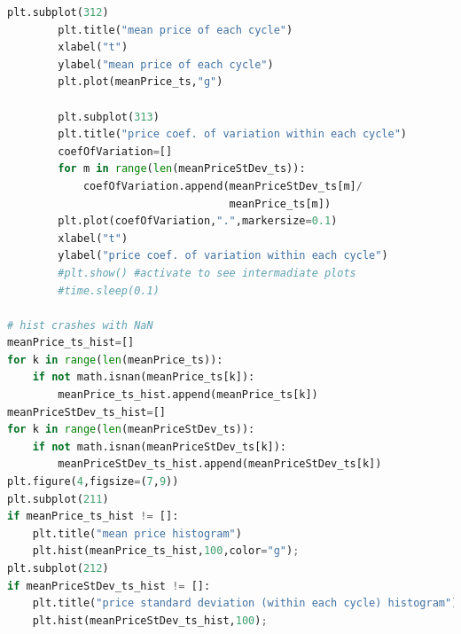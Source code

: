 \documentclass[10pt]{report}
\renewcommand{\thesection}{\arabic{section}} %
\begin{document}
\begin{lstlisting}[language=Python, caption=The unstructured version, 
label={The unstructured version},basicstyle=\ttfamily\footnotesize]
        plt.subplot(312)
        plt.title("mean price of each cycle")
        xlabel("t")
        ylabel("mean price of each cycle")
        plt.plot(meanPrice_ts,"g")
        
        plt.subplot(313)
        plt.title("price coef. of variation within each cycle")
        coefOfVariation=[]
        for m in range(len(meanPriceStDev_ts)):
            coefOfVariation.append(meanPriceStDev_ts[m]/
                                   meanPrice_ts[m])
        plt.plot(coefOfVariation,".",markersize=0.1)
        xlabel("t")
        ylabel("price coef. of variation within each cycle")
        #plt.show() #activate to see intermadiate plots
        #time.sleep(0.1)

# hist crashes with NaN
meanPrice_ts_hist=[]
for k in range(len(meanPrice_ts)): 
    if not math.isnan(meanPrice_ts[k]):
        meanPrice_ts_hist.append(meanPrice_ts[k])
meanPriceStDev_ts_hist=[]
for k in range(len(meanPriceStDev_ts)): 
    if not math.isnan(meanPriceStDev_ts[k]):
        meanPriceStDev_ts_hist.append(meanPriceStDev_ts[k])
plt.figure(4,figsize=(7,9))
plt.subplot(211)
if meanPrice_ts_hist != []:
    plt.title("mean price histogram")
    plt.hist(meanPrice_ts_hist,100,color="g");
plt.subplot(212)
if meanPriceStDev_ts_hist != []:
    plt.title("price standard deviation (within each cycle) histogram")
    plt.hist(meanPriceStDev_ts_hist,100);
\end{lstlisting}




\renewcommand{\thesubsection}{\thesection.\alph{subsection}}
\renewcommand{\thesection}{\thechapter.\arabic{section}}
\end{document}
